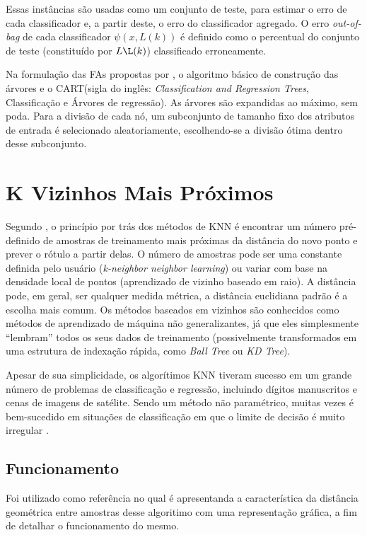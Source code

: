 Essas instâncias são usadas como um conjunto de teste, para estimar o erro de cada classificador e, a partir deste, o erro do classificador agregado. O erro \textit{out-of-bag} de cada classificador $ \psi (x,L(k)) $ é definido como o percentual do conjunto de teste (constituído por $ L\L(k) $) classificado erroneamente. 

Na formulação das FAs propostas por \cite{breiman2001random}, o algoritmo básico de construção das árvores e o CART(sigla do inglês: \textit{Classification and Regression Trees}, Classificação e Árvores de regressão)\cite{breiman2017classification}. As árvores são expandidas ao máximo, sem poda. Para a divisão de cada nó, um subconjunto de tamanho fixo dos atributos de entrada é selecionado aleatoriamente, escolhendo-se a divisão ótima dentro desse subconjunto.

\section{K Vizinhos Mais Próximos}

Segundo \cite{scikitlearn}, o princípio por trás dos métodos de KNN é encontrar um número pré-definido de amostras de treinamento mais próximas da distância do novo ponto e prever o rótulo a partir delas. O número de amostras pode ser uma constante definida pelo usuário (\textit{k-neighbor neighbor learning}) ou variar com base na densidade local de pontos (aprendizado de vizinho baseado em raio). A distância pode, em geral, ser qualquer medida métrica, a distância euclidiana padrão é a escolha mais comum. Os métodos baseados em vizinhos são conhecidos como métodos de aprendizado de máquina não generalizantes, já que eles simplesmente “lembram” todos os seus dados de treinamento (possivelmente transformados em uma estrutura de indexação rápida, como \textit{Ball Tree} ou \textit{KD Tree}).

Apesar de sua simplicidade, os algorítimos KNN tiveram sucesso em um grande número de problemas de classificação e regressão, incluindo dígitos manuscritos e cenas de imagens de satélite. Sendo um método não paramétrico, muitas vezes é bem-sucedido em situações de classificação em que o limite de decisão é muito irregular \cite{scikitlearn}.

\subsection{Funcionamento}

Foi utilizado como referência \cite{peterson2009k} no qual é apresentanda a característica da distância geométrica entre amostras desse algoritimo com uma representação gráfica, a fim de detalhar o funcionamento do mesmo.

